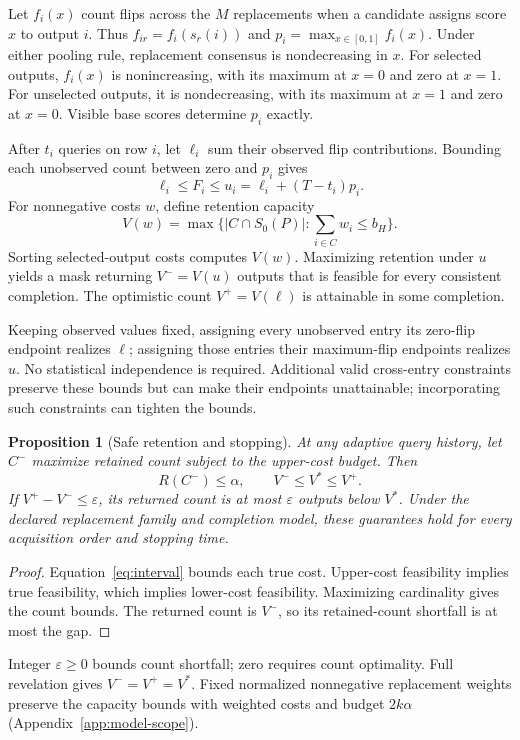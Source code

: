\documentclass[11pt]{article}
\newtheorem{proposition}{Proposition}
\begin{document}
Let $f_i(x)$ count flips across the $M$ replacements when a candidate assigns score $x$ to output $i$. Thus $f_{ir}=f_i(s_r(i))$ and $p_i=\max_{x\in[0,1]}f_i(x)$. Under either pooling rule, replacement consensus is nondecreasing in $x$. For selected outputs, $f_i(x)$ is nonincreasing, with its maximum at $x=0$ and zero at $x=1$. For unselected outputs, it is nondecreasing, with its maximum at $x=1$ and zero at $x=0$. Visible base scores determine $p_i$ exactly.

After $t_i$ queries on row $i$, let $\ell_i$ sum their observed flip contributions. Bounding each unobserved count between zero and $p_i$ gives
\begin{equation}
 \ell_i\le F_i\le u_i=\ell_i+(T-t_i)p_i.
 \label{eq:interval}
\end{equation}
For nonnegative costs $w$, define retention capacity
\[
 V(w)=\max\{|C\cap S_0(P)|:\sum_{i\in C}w_i\le b_H\}.
\]
Sorting selected-output costs computes $V(w)$. Maximizing retention under $u$ yields a mask returning $V^-=V(u)$ outputs that is feasible for every consistent completion. The optimistic count $V^+=V(\ell)$ is attainable in some completion.

Keeping observed values fixed, assigning every unobserved entry its zero-flip endpoint realizes $\ell$; assigning those entries their maximum-flip endpoints realizes $u$. No statistical independence is required. Additional valid cross-entry constraints preserve these bounds but can make their endpoints unattainable; incorporating such constraints can tighten the bounds. 
\begin{proposition}[Safe retention and stopping]
\label{prop:stop}
At any adaptive query history, let $C^-$ maximize retained count subject to the upper-cost budget. Then
\[
 R(C^-)\le\alpha,\qquad V^-\le V^*\le V^+.
\]
If $V^+-V^-\le\varepsilon$, its returned count is at most $\varepsilon$ outputs below $V^*$. Under the declared replacement family and completion model, these guarantees hold for every acquisition order and stopping time.
\end{proposition}
\begin{proof}
Equation~\ref{eq:interval} bounds each true cost. Upper-cost feasibility implies true feasibility, which implies lower-cost feasibility. Maximizing cardinality gives the count bounds. The returned count is $V^-$, so its retained-count shortfall is at most the gap.
\end{proof}

Integer $\varepsilon\ge0$ bounds count shortfall; zero requires count optimality. Full revelation gives $V^-=V^+=V^*$. Fixed normalized nonnegative replacement weights preserve the capacity bounds with weighted costs and budget $2k\alpha$ (Appendix~\ref{app:model-scope}).
\end{document}
